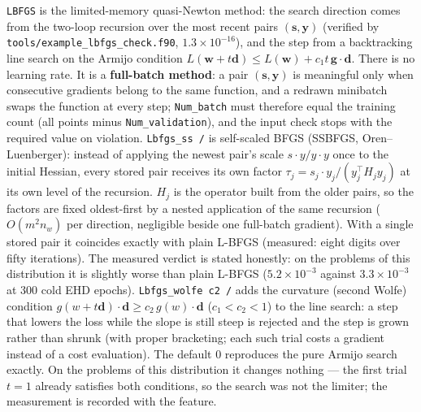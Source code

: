 \documentclass[10pt,a4paper]{article}
\newcommand{\code}[1]{\texttt{#1}}
\newcommand{\mi}[1]{\boldsymbol{#1}}
\begin{document}
\code{LBFGS} is the limited-memory quasi-Newton method: the search
direction comes from the two-loop recursion over the most recent
pairs $(\mi{s},\mi{y})$ (verified by
\code{tools/example\_lbfgs\_check.f90}, $1.3\times10^{-16}$), and the
step from a backtracking line search on the Armijo condition
$L(\mi{w}+t\mi{d})\le L(\mi{w})+c_1 t\,\mi{g}\!\cdot\!\mi{d}$. There
is no learning rate. It is a \textbf{full-batch method}: a pair
$(\mi{s},\mi{y})$ is meaningful only when consecutive gradients
belong to the same function, and a redrawn minibatch swaps the
function at every step; \code{Num\_batch} must therefore equal the
training count (all points minus \code{Num\_validation}), and the
input check stops with the required value on violation.
\code{Lbfgs\_ss /} is self-scaled BFGS (SSBFGS, Oren--Luenberger):
instead of applying the newest pair's scale
$s\!\cdot\!y/y\!\cdot\!y$ once to the initial Hessian, every stored
pair receives its own factor
$\tau_j = s_j\!\cdot\!y_j/(y_j^{\top}H_j y_j)$ at its own level of
the recursion. $H_j$ is the operator built from the older pairs, so
the factors are fixed oldest-first by a nested application of the
same recursion ($O(m^2 n_w)$ per direction, negligible beside one
full-batch gradient). With a single stored pair it coincides exactly
with plain L-BFGS (measured: eight digits over fifty iterations). The
measured verdict is stated honestly: on the problems of this
distribution it is slightly worse than plain L-BFGS
($5.2\times10^{-3}$ against $3.3\times10^{-3}$ at 300 cold EHD
epochs).
\code{Lbfgs\_wolfe c2 /} adds the curvature (second Wolfe) condition
$g(w+t\mi{d})\!\cdot\!\mi{d} \ge c_2\, g(w)\!\cdot\!\mi{d}$
($c_1 < c_2 < 1$) to the line search: a step that lowers the loss
while the slope is still steep is rejected and the step is grown
rather than shrunk (with proper bracketing; each such trial costs a
gradient instead of a cost evaluation). The default 0 reproduces the
pure Armijo search exactly. On the problems of this distribution it
changes nothing --- the first trial $t=1$ already satisfies both
conditions, so the search was not the limiter; the measurement is
recorded with the feature.
\end{document}
